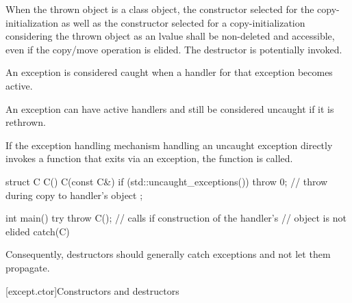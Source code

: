 \pnum
{}%
%
When the thrown object is a class object, the constructor selected for
the copy-initialization as well as the constructor selected for
a copy-initialization considering the thrown object as an lvalue
shall be non-deleted and accessible, even if the copy/move operation is
elided.
The destructor is potentially invoked.

\pnum
{}%
%
An exception is considered caught when a handler for that exception
becomes active.
\begin{note}
An exception can have active handlers and still be considered uncaught if
it is rethrown.
\end{note}

\pnum
{}%
%
If the exception handling mechanism
handling an uncaught exception
directly invokes a function that exits via an
exception, the function  is called.
\begin{example}
\begin{codeblock}
struct C {
  C() { }
  C(const C&) {
    if (std::uncaught_exceptions()) {
      throw 0;      // throw during copy to handler's  object
    }
  }
};

int main() {
  try {
    throw C();      // calls  if construction of the handler's
                    //  object is not elided
  } catch(C) { }
}
\end{codeblock}
\end{example}
\begin{note}
\setlength{\emergencystretch}{1em}
Consequently, destructors should generally catch exceptions and not let them propa\-gate.
\end{note}


[except.ctor]{Constructors and destructors}%
%
%

